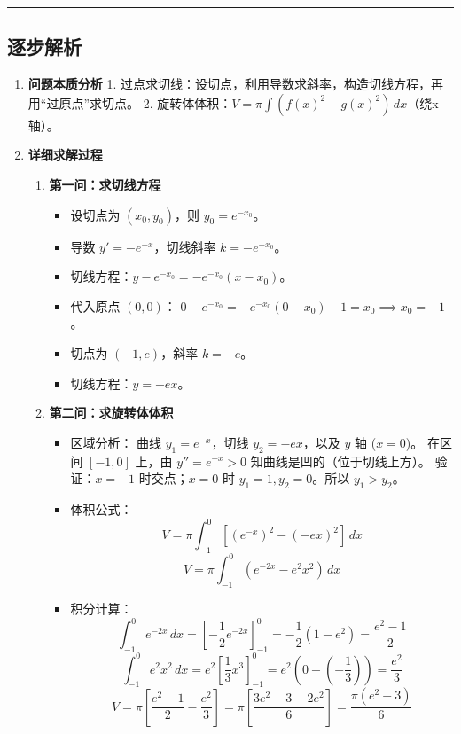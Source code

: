\documentclass[UTF8,10pt]{ctexart}
\newenvironment{redenv}{\color{red}}{}
\newenvironment{detailedanalysis}{%
    \color{red}
    \begin{enumerate}[label=\textbf{第\arabic*步：}, leftmargin=*, align=left, itemsep=0pt, parsep=0pt, topsep=0pt, partopsep=0pt]
}{%
    \end{enumerate}
}
\newcommand{\analysisrule}{\noindent\rule{\textwidth}{0.8pt}\vspace{-0.5em}}
\begin{document}
\begin{redenv}
\analysisrule
\subsection*{逐步解析}

\begin{detailedanalysis}
\item \textbf{问题本质分析}
1. 过点求切线：设切点，利用导数求斜率，构造切线方程，再用“过原点”求切点。
2. 旋转体体积：$V = \pi \int (f(x)^2 - g(x)^2)\, dx$（绕x轴）。

\item \textbf{详细求解过程}
\begin{enumerate}[label=(\alph*)]
    \item \textbf{第一问：求切线方程}
    \begin{itemize}
        \item 设切点为 $(x_0, y_0)$，则 $y_0 = e^{-x_0}$。
        \item 导数 $y' = -e^{-x}$，切线斜率 $k = -e^{-x_0}$。
        \item 切线方程：$y - e^{-x_0} = -e^{-x_0}(x - x_0)$。
        \item 代入原点 $(0,0)$：
        $0 - e^{-x_0} = -e^{-x_0}(0 - x_0)$
        $-1 = x_0 \implies x_0 = -1$。
        \item 切点为 $(-1, e)$，斜率 $k = -e$。
        \item 切线方程：$y = -ex$。
    \end{itemize}
    
    \item \textbf{第二问：求旋转体体积}
    \begin{itemize}
        \item 区域分析：
        曲线 $y_1 = e^{-x}$，切线 $y_2 = -ex$，以及 $y$ 轴 ($x=0$)。
        在区间 $[-1, 0]$ 上，由 $y'' = e^{-x} > 0$ 知曲线是凹的（位于切线上方）。
        验证：$x=-1$ 时交点；$x=0$ 时 $y_1=1, y_2=0$。所以 $y_1 > y_2$。
        \item 体积公式：
        \[ V = \pi \int_{-1}^0 [ (e^{-x})^2 - (-ex)^2 ]\, dx \]
        \[ V = \pi \int_{-1}^0 (e^{-2x} - e^2 x^2)\, dx \]
        \item 积分计算：
        \[ \int_{-1}^0 e^{-2x}\, dx = [-\dfrac{1}{2}e^{-2x}]_{-1}^0 = -\dfrac{1}{2}(1 - e^2) = \dfrac{e^2-1}{2} \]
        \[ \int_{-1}^0 e^2 x^2\, dx = e^2 [\dfrac{1}{3}x^3]_{-1}^0 = e^2 (0 - (-\dfrac{1}{3})) = \dfrac{e^2}{3} \]
        \[ V = \pi [ \dfrac{e^2-1}{2} - \dfrac{e^2}{3} ] = \pi [ \dfrac{3e^2-3 - 2e^2}{6} ] = \dfrac{\pi(e^2-3)}{6} \]
    \end{itemize}
\end{enumerate}


\end{detailedanalysis}
\end{redenv}
\end{document}
